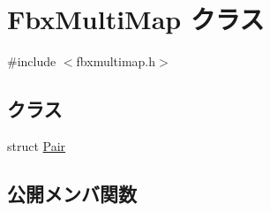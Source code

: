 \hypertarget{class_fbx_multi_map}{}\section{Fbx\+Multi\+Map クラス}
\label{class_fbx_multi_map}


{\ttfamily \#include $<$fbxmultimap.\+h$>$}

\subsection*{クラス}
\begin{DoxyCompactItemize}
\item 
struct \hyperlink{struct_fbx_multi_map_1_1_pair}{Pair}
\end{DoxyCompactItemize}
\subsection*{公開メンバ関数}
